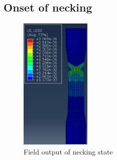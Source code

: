 \documentclass[11pt]{article}
\numberwithin{equation}{section}
\begin{document}
\subsection{Onset of necking}
\begin{figure}[H]
    \centering
    \includegraphics[width = 0.3\textwidth]{./img/necking.png}
    \caption{Field output of necking state}
\end{figure}
\end{document}
